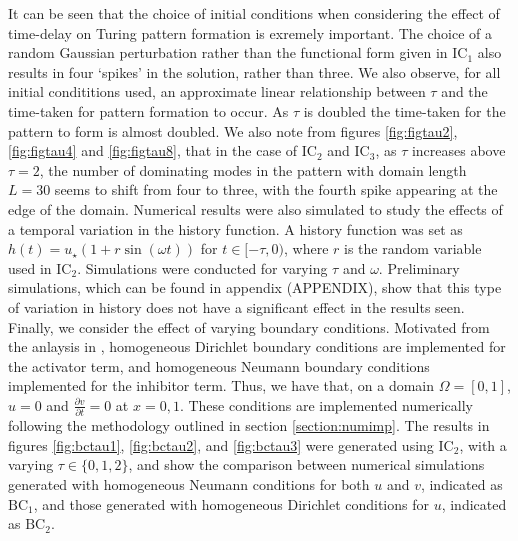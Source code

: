It can be seen that the choice of initial conditions when considering the effect of time-delay on Turing pattern formation is exremely important. The choice of a random Gaussian perturbation rather than the functional form given in $\text{IC}_1$ also results in four `spikes' in the solution, rather than three. We also observe, for all initial condititions used, an approximate linear relationship between $\tau$ and the time-taken for pattern formation to occur. As $\tau$ is doubled the time-taken for the pattern to form is almost doubled. We also note from figures \ref{fig:figtau2}, \ref{fig:figtau4} and \ref{fig:figtau8}, that in the case of $\text{IC}_2$ and $\text{IC}_3$, as $\tau$ increases above $\tau=2$, the number of dominating modes in the pattern with domain length $L=30$ seems to shift from four to three, with the fourth spike appearing at the edge of the domain.
Numerical results were also simulated to study the effects of a temporal variation in the history function. A history function was set as $h(t)=u_\star(1+r\sin(\omega t))$ for $t\in[-\tau,0)$, where $r$ is the random variable used in $\text{IC}_2$. Simulations were conducted for varying $\tau$ and $\omega$. Preliminary simulations, which can be found in appendix (APPENDIX), show that this type of variation in history does not have a significant effect in the results seen. Finally, we consider the effect of varying boundary conditions. Motivated from the anlaysis in \cite{krausemixed}, homogeneous Dirichlet boundary conditions are implemented for the activator term, and homogeneous Neumann boundary conditions implemented for the inhibitor term. Thus, we have that, on a domain $\Omega=[0,1]$, $u=0$ and $\frac{\partial v}{\partial t}=0$ at $x=0, 1$. These conditions are implemented numerically following the methodology outlined in section \ref{section:numimp}. The results in figures \ref{fig:bctau1}, \ref{fig:bctau2}, and \ref{fig:bctau3} were generated using $\text{IC}_2$, with a varying $\tau\in\{0,1,2\}$, and show the comparison between numerical simulations generated with homogeneous Neumann conditions for both $u$ and $v$, indicated as $\text{BC}_1$, and those generated with homogeneous Dirichlet conditions for $u$, indicated as $\text{BC}_2$.

